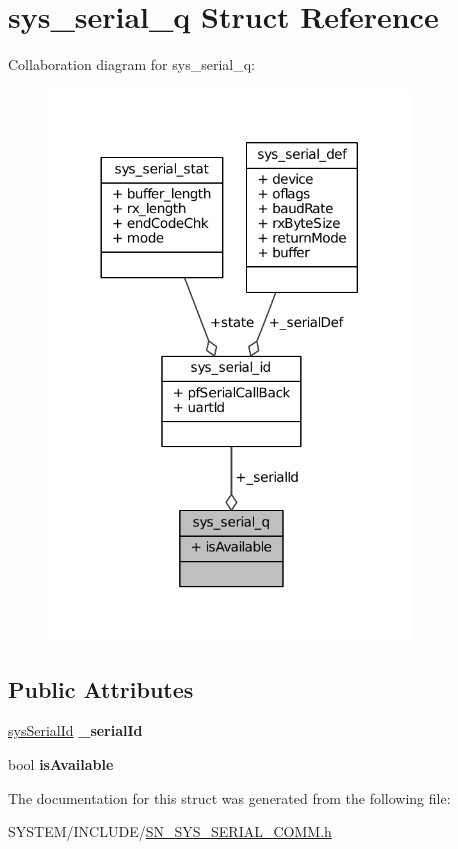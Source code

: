 \hypertarget{structsys__serial__q}{}\section{sys\+\_\+serial\+\_\+q Struct Reference}
\label{structsys__serial__q}


Collaboration diagram for sys\+\_\+serial\+\_\+q\+:\nopagebreak
\begin{figure}[H]
\begin{center}
\leavevmode
\includegraphics[width=272pt]{structsys__serial__q__coll__graph}
\end{center}
\end{figure}
\subsection*{Public Attributes}
\begin{DoxyCompactItemize}
\item 
\mbox{\label{structsys__serial__q_a9609f82216c9986c4570496f3f8efe35}} 
\hyperlink{structsys__serial__id}{sys\+Serial\+Id} {\bfseries \+\_\+serial\+Id}
\item 
\mbox{\label{structsys__serial__q_ade2463824ded031f2aea3f5c7c3d0920}} 
bool {\bfseries is\+Available}
\end{DoxyCompactItemize}


The documentation for this struct was generated from the following file\+:\begin{DoxyCompactItemize}
\item 
S\+Y\+S\+T\+E\+M/\+I\+N\+C\+L\+U\+D\+E/\hyperlink{SN__SYS__SERIAL__COMM_8h}{S\+N\+\_\+\+S\+Y\+S\+\_\+\+S\+E\+R\+I\+A\+L\+\_\+\+C\+O\+M\+M.\+h}\end{DoxyCompactItemize}
